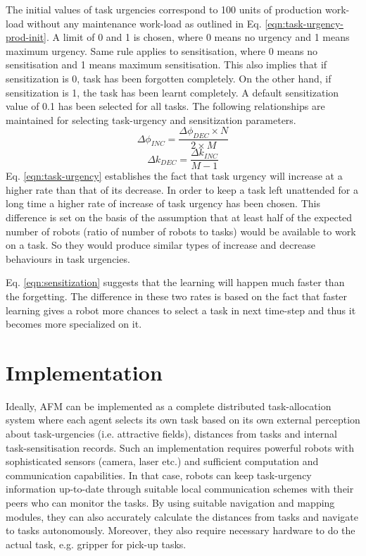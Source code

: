 The initial values of task urgencies correspond to 100 units of production work-load without any maintenance work-load as outlined in Eq. \ref{eqn:task-urgency-prod-init}.  A limit of 0 and 1 is chosen, where 0 means no urgency and 1 means maximum urgency. Same rule applies to sensitisation, where 0 means no sensitisation and 1 means maximum sensitisation. This also implies that if sensitization is 0, task has been forgotten completely. On the other hand, if sensitization is 1, the task has been learnt completely.  A default sensitization value of 0.1 has been selected for all tasks. The following relationships are maintained for selecting task-urgency and sensitization parameters.
\begin{equation}
\Delta\phi_{INC} = \frac{\Delta\phi_{DEC} \times N}{2 \times M}
\label{eqn:task-urgency}
\end{equation}
%
\begin{equation}
\Delta k_{DEC} = \frac{\Delta k_{INC}} {M - 1} 
\label{eqn:sensitization}
\end{equation}
%
Eq. \ref{eqn:task-urgency} establishes the fact that task urgency will increase at a higher rate than that of its decrease. In order to keep a task left unattended for a long time  a higher rate of increase of task urgency has been chosen. This difference is set on the basis of the assumption that at least half of the expected number of robots (ratio of number of robots to tasks) would be available to work on a task. So they would produce similar types of increase and decrease behaviours in task urgencies.

Eq. \ref{eqn:sensitization} suggests that the learning will happen much faster than the forgetting. The difference in these two rates is based on the fact that faster learning gives a robot more chances to select a task in next time-step and thus it becomes more specialized on it. %
\section{Implementation}
\label{afm:impl}
Ideally, AFM can be implemented as a complete distributed task-allocation system where each agent selects its own task based on its own external perception about task-urgencies (i.e. attractive fields),  distances from tasks and internal task-sensitisation records. Such an implementation requires powerful robots with sophisticated sensors (camera, laser etc.) and sufficient computation and communication  capabilities. In that case, robots can keep  task-urgency information up-to-date  through suitable local communication  schemes with their peers who can monitor the tasks. By using suitable navigation and mapping modules, they can also accurately calculate the distances from tasks and navigate to tasks autonomously. Moreover, they also require necessary hardware to do the actual task, e.g. gripper for pick-up tasks.

